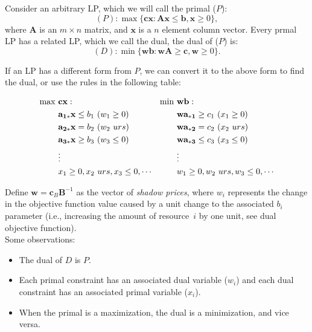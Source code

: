 %


Consider an arbitrary LP, which we will call the primal ($P$): 
$$(P):\max \{\mathbf{cx}: \mathbf{Ax} \le \mathbf{b}, \mathbf{x} \ge 0\},$$ 
where $\mathbf{A}$ is an $m\times n$ matrix, and $\mathbf{x}$ is a $n$ element column vector.  Every prmal LP has a related LP, which we call the dual, the dual of ($P$) is:
$$(D):\min \{\mathbf{wb}: \mathbf{wA} \ge \mathbf{c}, \mathbf{w} \ge 0\}.$$ 

If an LP has a different form from $P$, we can convert it to the above form to find the dual, or use the rules in the following table:

\begin{align*}
\max~& {\bf cx}:~~~~~~~~~~~~			& \min~ & {\bf wb}:  \\
&{\bf a_{1*}x} \le b_1~(w_1 \ge 0)   &     & {\bf wa_{*1}} \ge c_1~(x_1 \ge 0) \\ 
&{\bf a_{2*}x} = b_2~(w_2~urs)       &     & {\bf wa_{*2}} = c_2~(x_2~urs) \\
&{\bf a_{3*}x} \ge b_3~(w_3 \le 0) &        & {\bf wa_{*3}} \le c_3~(x_3 \le 0) \\
&\vdots 							   &      & \vdots \\ 
&x_1 \ge 0, x_2~urs, x_3 \le 0, \cdots &  	 & w_1 \ge 0, w_2~urs, w_3 \le 0,\cdots   
\end{align*}

Define $\mathbf{w}=\mathbf{c}_B\mathbf{B}^{-1}$ as the vector of {\it shadow prices}, where $w_i$ represents the change in the objective function value caused by a unit change to the associated $b_i$ parameter (i.e., increasing the amount of resource~$i$ by one unit, see dual objective function). \\

Some observations:
\begin{itemize}
\item The dual of $D$ is $P$.
\item Each primal constraint has an associated dual variable ($w_i$) and each dual constraint has an associated primal variable ($x_i$).
\item When the primal is a maximization, the dual is a minimization, and vice versa.
\end{itemize}



